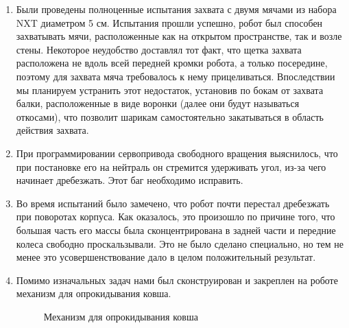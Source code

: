 \begin{enumerate}
\begin{enumerate}
      \item Были проведены полноценные испытания захвата с двумя мячами из набора NXT диаметром 5 см. Испытания прошли успешно, робот был способен захватывать мячи, расположенные как на открытом пространстве, так и возле стены. Некоторое неудобство доставлял тот факт, что щетка захвата расположена не вдоль всей передней кромки робота, а только посередине, поэтому для захвата мяча требовалось к нему прицеливаться. Впоследствии мы планируем устранить этот недостаток, установив по бокам от захвата балки, расположенные в виде воронки (далее они будут называться откосами), что позволит шарикам самостоятельно закатываться в область действия захвата.\newline
      
      \item При программировании сервопривода свободного вращения выяснилось, что при постановке его на нейтраль он стремится удерживать угол, из-за чего начинает дребезжать. Этот баг необходимо исправить.\newline
      
      \item Во время испытаний было замечено, что робот почти перестал дребезжать при поворотах корпуса. Как оказалось, это произошло по причине того, что большая часть его массы была сконцентрирована в задней части и передние колеса свободно проскальзывали. Это не было сделано специально, но тем не менее это усовершенствование дало в целом положительный результат.\newline
      
      \item Помимо изначальных задач нами был сконструирован и закреплен на роботе механизм для опрокидывания ковша.\newline
      
      \begin{figure}[H]
      	\begin{minipage}[h]{1\linewidth}
      		\caption{Механизм для опрокидывания ковша}
      	\end{minipage}
      \end{figure}
      

\end{enumerate}
\end{enumerate}
